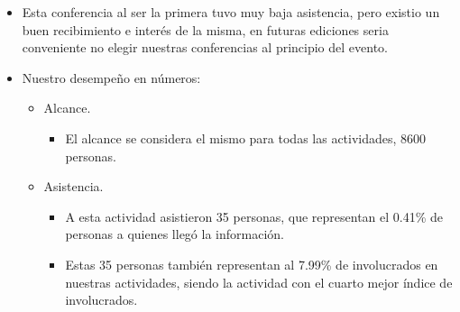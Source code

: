 \documentclass[a4paper,11pt]{article}                 %
\begin{document}
      \begin{itemize}
    \item Esta conferencia al ser la primera tuvo muy baja asistencia, pero existio un buen recibimiento e interés de la misma, en futuras ediciones seria conveniente no elegir nuestras conferencias al principio del evento.
    
    \item Nuestro desempeño en números:
    
    \begin{itemize}
    \item Alcance.
    \begin{itemize}
      \item El alcance se considera el mismo para todas las actividades, 8600 personas.
    \end{itemize}

    \item Asistencia.
    \begin{itemize}
      \item A esta actividad asistieron 35 personas, que representan el 0.41\% de personas a quienes llegó la información.
      \item Estas 35 personas también representan al 7.99\%  de involucrados en nuestras actividades, siendo la actividad con el cuarto mejor índice de involucrados. 
    \end{itemize}
    \end{itemize} 
    
  \end{itemize}
   
  


\end{document}
